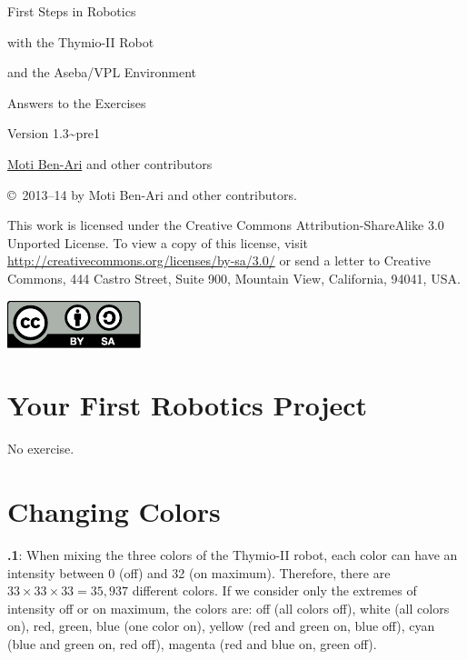 \documentclass[12pt,a4paper,english]{article}
\begin{document}
\thispagestyle{empty}

\begin{center}
\begin{bfseries}

\begin{Large}
First Steps in Robotics

with the
Thymio-II Robot

and the
Aseba/VPL Environment

\bigskip

Answers to the Exercises

\end{Large}

Version 1.3{\textasciitilde}pre1

\bigskip

\href{http://www.weizmann.ac.il/sci-tea/benari/}{Moti Ben-Ari} and other contributors

\end{bfseries}
\end{center}

\bigskip

\copyright{}\  2013--14 by Moti Ben-Ari and other contributors.

This work is licensed under the Creative Commons
Attribution-ShareAlike 3.0 Unported License. To view a copy
of this license, visit
\url{http://creativecommons.org/licenses/by-sa/3.0/}
or send a letter to Creative Commons, 444 Castro Street, Suite 900,
Mountain View, California, 94041, USA.

\begin{center}
\hspace{6pt}\includegraphics[width=.2\textwidth]{../images/by-sa}
\end{center}

\section{Your First Robotics Project}

No exercise.

\section{Changing Colors}

\textbf{\thesection.1}: 
When mixing the three colors of the Thymio-II robot, each color can have
an intensity between 0 (off) and 32 (on maximum). Therefore, there are
$33 \times 33 \times 33=35,937$ different colors. If we consider only
the extremes of intensity off or on maximum, the colors are: off (all
colors off), white (all colors on), red, green, blue (one color on),
yellow (red and green on, blue off), cyan (blue and green on, red off),
magenta (red and blue on, green off).
\end{document}
